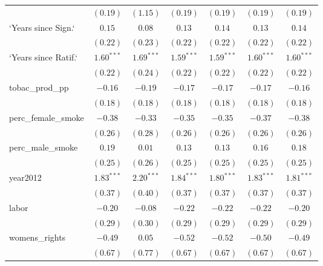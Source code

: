 \begin{table}[!h]
\begin{center}
\begin{tabular}{l c c c c c c }
                        & $(0.19)$     & $(1.15)$     & $(0.19)$     & $(0.19)$     & $(0.19)$     & $(0.19)$     \\
`Years since Sign.`     & $0.15$       & $0.08$       & $0.13$       & $0.14$       & $0.13$       & $0.14$       \\
                        & $(0.22)$     & $(0.23)$     & $(0.22)$     & $(0.22)$     & $(0.22)$     & $(0.22)$     \\
`Years since Ratif.`    & $1.60^{***}$ & $1.69^{***}$ & $1.59^{***}$ & $1.59^{***}$ & $1.60^{***}$ & $1.60^{***}$ \\
                        & $(0.22)$     & $(0.24)$     & $(0.22)$     & $(0.22)$     & $(0.22)$     & $(0.22)$     \\
tobac\_prod\_pp         & $-0.16$      & $-0.19$      & $-0.17$      & $-0.17$      & $-0.17$      & $-0.16$      \\
                        & $(0.18)$     & $(0.18)$     & $(0.18)$     & $(0.18)$     & $(0.18)$     & $(0.18)$     \\
perc\_female\_smoke     & $-0.38$      & $-0.33$      & $-0.35$      & $-0.35$      & $-0.37$      & $-0.38$      \\
                        & $(0.26)$     & $(0.28)$     & $(0.26)$     & $(0.26)$     & $(0.26)$     & $(0.26)$     \\
perc\_male\_smoke       & $0.19$       & $0.01$       & $0.13$       & $0.13$       & $0.16$       & $0.18$       \\
                        & $(0.25)$     & $(0.26)$     & $(0.25)$     & $(0.25)$     & $(0.25)$     & $(0.25)$     \\
year2012                & $1.83^{***}$ & $2.20^{***}$ & $1.84^{***}$ & $1.80^{***}$ & $1.83^{***}$ & $1.81^{***}$ \\
                        & $(0.37)$     & $(0.40)$     & $(0.37)$     & $(0.37)$     & $(0.37)$     & $(0.37)$     \\
labor                   & $-0.20$      & $-0.08$      & $-0.22$      & $-0.22$      & $-0.22$      & $-0.20$      \\
                        & $(0.29)$     & $(0.30)$     & $(0.29)$     & $(0.29)$     & $(0.29)$     & $(0.29)$     \\
womens\_rights          & $-0.49$      & $0.05$       & $-0.52$      & $-0.52$      & $-0.50$      & $-0.49$      \\
                        & $(0.67)$     & $(0.77)$     & $(0.67)$     & $(0.67)$     & $(0.67)$     & $(0.67)$     \\

\end{tabular}
\end{center}
\end{table}
